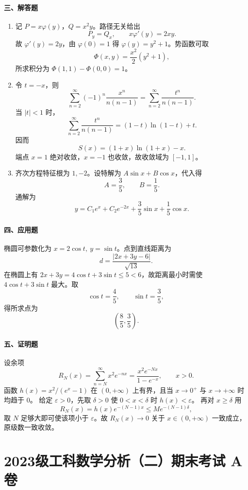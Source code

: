 \paragraph{三、解答题}
\begin{enumerate}
  \item 记 $P=x\varphi(y)$，$Q=x^2y$。路径无关给出
  \[
    P_y=Q_x,\qquad x\varphi'(y)=2xy.
  \]
  故 $\varphi'(y)=2y$，由 $\varphi(0)=1$ 得 $\varphi(y)=y^2+1$。势函数可取
  \[
    \Phi(x,y)=\frac{x^2}{2}(y^2+1),
  \]
  所求积分为 $\Phi(1,1)-\Phi(0,0)=1$。
  \item 令 $t=-x$，则
  \[
    \sum_{n=2}^\infty(-1)^n\frac{x^n}{n(n-1)}
    =\sum_{n=2}^\infty\frac{t^n}{n(n-1)}.
  \]
  当 $|t|<1$ 时，
  \[
    \sum_{n=2}^\infty\frac{t^n}{n(n-1)}
    =(1-t)\ln(1-t)+t.
  \]
  因而
  \[
    S(x)=(1+x)\ln(1+x)-x.
  \]
  端点 $x=1$ 绝对收敛，$x=-1$ 也收敛，故收敛域为 $[-1,1]$。
  \item 齐次方程特征根为 $1,-2$。设特解为 $A\sin x+B\cos x$，代入得
  \[
    A=\frac35,\qquad B=\frac15.
  \]
  通解为
  \[
    y=C_1e^x+C_2e^{-2x}+\frac35\sin x+\frac15\cos x.
  \]
\end{enumerate}

\paragraph{四、应用题}
椭圆可参数化为 $x=2\cos t,\ y=\sin t$。点到直线距离为
\[
  d=\frac{|2x+3y-6|}{\sqrt{13}}.
\]
在椭圆上有 $2x+3y=4\cos t+3\sin t\le5<6$，故距离最小时需使 $4\cos t+3\sin t$ 最大。取
\[
  \cos t=\frac45,\qquad \sin t=\frac35,
\]
得所求点为
\[
  \left(\frac85,\frac35\right).
\]

\paragraph{五、证明题}
设余项
\[
  R_N(x)=\sum_{n=N}^\infty x^2e^{-nx}
  =\frac{x^2e^{-Nx}}{1-e^{-x}},\qquad x>0.
\]
函数 $h(x)=x^2/(e^x-1)$ 在 $(0,+\infty)$ 上有界，且当 $x\to0^+$ 与 $x\to+\infty$ 时均趋于 $0$。
给定 $\varepsilon>0$，先取 $\delta>0$ 使 $0<x<\delta$ 时 $h(x)<\varepsilon$。
再对 $x\ge\delta$ 用
\[
  R_N(x)=h(x)e^{-(N-1)x}\le M e^{-(N-1)\delta},
\]
取 $N$ 足够大即可使该项小于 $\varepsilon$。故 $R_N(x)\to0$ 关于 $x\in(0,+\infty)$ 一致成立，原级数一致收敛。


\section{2023级工科数学分析（二）期末考试 A 卷}

